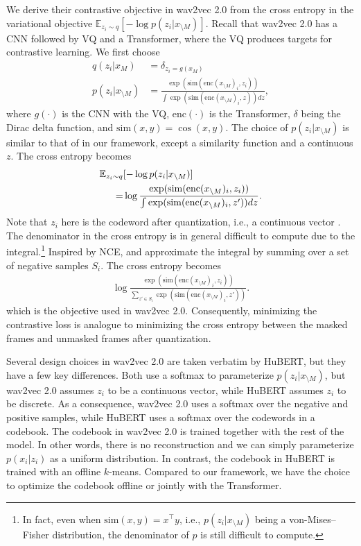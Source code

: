 We derive their contrastive objective in wav2vec 2.0 from the cross entropy in the variational objective
 $\mathbb{E}_{z_i \sim q}[-\log p(z_i | x_{\setminus M})]$.
Recall that wav2vec 2.0 has a CNN followed by VQ and a Transformer,
where the VQ produces targets for contrastive learning.
%
We first choose
\begin{align}
q(z_i | x_M) &= \delta_{z_i=g(x_M)} \label{eq:w2v2-q}\\
p(z_i | x_{\setminus M}) &= \frac{\exp(\mathrm{sim}(\mathrm{enc}(x_{\setminus M})_i, z_i))}{
  \int \exp(\mathrm{sim}(\mathrm{enc}(x_{\setminus M})_i, z)) dz},
\end{align}
where $g(\cdot)$ is the CNN with the VQ, $\mathrm{enc}(\cdot)$ is the Transformer,
$\delta$ being the Dirac delta function, and $\mathrm{sim}(x, y) = \cos(x, y)$.
The choice of $p(z_i | x_{\setminus M})$ is similar to that of  in our framework,
except a similarity function and a continuous $z$.
The cross entropy becomes
\begin{align}
    \mathbb{E}_{z_i \sim q}&[-\log p(z_i | x_{\setminus M})] \notag\\
    =&\log\frac{\exp(\mathrm{sim}(\mathrm{enc}(x_{\setminus M})_i, z_i))}{
   \int\exp(\mathrm{sim}(\mathrm{enc}(x_{\setminus M})_i, z')) dz}.
\end{align}
Note that $z_i$ here is the codeword after quantization, i.e., a continuous vector \citep{baevski2020wav2vec}.
The denominator in the cross entropy is in general difficult
to compute due to the integral.\footnote{In fact,
even when $\mathrm{sim}(x, y) = x^\top y$, i.e.,
$p(z_i | x_{\setminus M})$ being a von-Mises--Fisher distribution,
the denominator of $p$ is still difficult to compute.}
Inspired by NCE, \citet{oord2018representation} and \citet{baevski2020wav2vec}
approximate the integral by summing over a set of negative samples $S_i$. 
The cross entropy becomes
\begin{align}
    \log \frac{\exp(\mathrm{sim}(\mathrm{enc}(x_{\setminus M})_i, z_i))}{
  \sum_{z' \in S_i} \exp(\mathrm{sim}(\mathrm{enc}(x_{\setminus M})_i, z'))}.
  \label{eq:w2v2}
\end{align}
which is the objective used in wav2vec 2.0.
Consequently, minimizing the contrastive loss is analogue to minimizing the cross entropy between 
the masked frames and unmasked frames after quantization.

%
%
%
%
%
%
%
%
%
%
%
%
%
%
%
%
%
%
%
%
%
%
%

%
%
%
%
%
%
%
Several design choices in wav2vec 2.0 are taken verbatim by HuBERT, but they have a few key differences.
Both use a softmax to parameterize $p(z_i | x_{\setminus M})$, but wav2vec 2.0 assumes $z_i$ to be a continuous vector, while HuBERT assumes $z_i$ to be discrete.
As a consequence, wav2vec 2.0 uses a softmax over the negative and positive samples, while HuBERT uses a softmax over the codewords in a codebook.
The codebook in wav2vec 2.0 is trained together with the rest of the model.
In other words, there is no reconstruction and we can simply parameterize
$p(x_i | z_i)$ as a uniform distribution. 
In contrast, the codebook in HuBERT is trained with an offline $k$-means.
Compared to our framework, we have the choice to optimize the codebook
offline or jointly with the Transformer.

